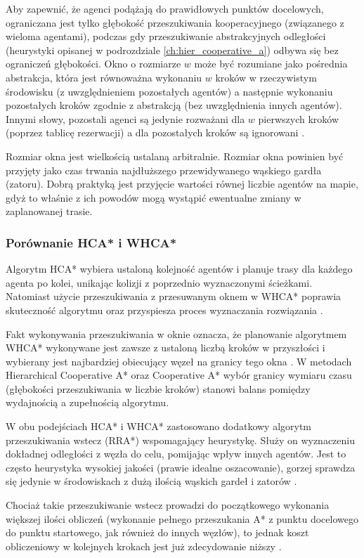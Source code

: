 Aby zapewnić, że agenci podążają do prawidłowych punktów docelowych, ograniczana jest tylko głębokość przeszukiwania kooperacyjnego (związanego z wieloma agentami), podczas gdy przeszukiwanie abstrakcyjnych odległości (heurystyki opisanej w podrozdziale \ref{ch:hier_cooperative_a}) odbywa się bez ograniczeń głębokości. Okno o rozmiarze $w$ może być rozumiane jako pośrednia abstrakcja, która jest równoważna wykonaniu $w$ kroków w rzeczywistym środowisku (z uwzględnieniem pozostałych agentów) a następnie wykonaniu pozostałych kroków zgodnie z abstrakcją (bez uwzględnienia innych agentów). Innymi słowy, pozostali agenci są jedynie rozważani dla $w$ pierwszych kroków (poprzez tablicę rezerwacji) a dla pozostałych kroków są ignorowani \cite{cooppath}.

Rozmiar okna jest wielkością ustalaną arbitralnie. Rozmiar okna powinien być przyjęty jako czas trwania najdłuższego przewidywanego wąskiego gardła (zatoru).
Dobrą praktyką jest przyjęcie wartości równej liczbie agentów na mapie, gdyż to właśnie z ich powodów mogą wystąpić ewentualne zmiany w zaplanowanej trasie.

\subsubsection{Porównanie HCA* i WHCA*}
Algorytm HCA* wybiera ustaloną kolejność agentów i planuje trasy dla każdego agenta po kolei, unikając kolizji z poprzednio wyznaczonymi ścieżkami. 
Natomiast użycie przeszukiwania z przesuwanym oknem w WHCA* poprawia skuteczność algorytmu oraz przyspiesza proces wyznaczania rozwiązania \cite{completealgo_standley}.

Fakt wykonywania przeszukiwania w oknie oznacza, że planowanie algorytmem WHCA* wykonywane jest zawsze z ustaloną liczbą kroków w przyszłości i wybierany jest najbardziej obiecujący węzeł na granicy tego okna \cite{rtcooppathfinding}. W metodach Hierarchical Cooperative A* oraz Cooperative A* wybór granicy wymiaru czasu (głębokości przeszukiwania w liczbie kroków) stanowi balans pomiędzy wydajnością a zupełnością algorytmu.

W obu podejściach HCA* i WHCA* zastosowano dodatkowy algorytm przeszukiwania wstecz (RRA*) wspomagający heurystykę. Służy on wyznaczeniu dokładnej odległości z węzła do celu, pomijając wpływ innych agentów. Jest to często heurystyka wysokiej jakości (prawie idealne oszacowanie), gorzej sprawdza się jedynie w środowiskach z dużą ilością wąskich gardeł i zatorów \cite{rtcooppathfinding}.

Chociaż takie przeszukiwanie wstecz prowadzi do początkowego wykonania większej ilości obliczeń (wykonanie pełnego przeszukania A* z punktu docelowego do punktu startowego, jak również do innych węzłów), to jednak koszt obliczeniowy w kolejnych krokach jest już zdecydowanie niższy \cite{rtcooppathfinding}.
